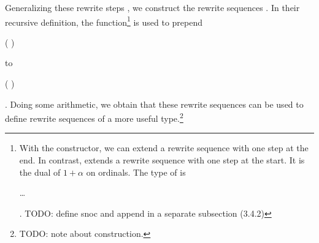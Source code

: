 Generalizing these rewrite steps
, we construct
the rewrite sequences
. In their
recursive definition, the 
function\footnote{With the
   constructor, we
  can extend a rewrite sequence with one step at the end. In contrast,
   extends a rewrite sequence
  with one step at the start. It is the dual of $1 + \alpha$ on
  ordinals. The type of 
  is \begin{coqdoccode}\ldots\end{coqdoccode}. TODO: define snoc and
    append in a separate subsection (3.4.2)} is used to
prepend \begin{coqdoccode}(
 
)\end{coqdoccode} to
\begin{coqdoccode}(
 
)\end{coqdoccode}. Doing some arithmetic, we obtain
that these rewrite sequences can be used to define rewrite sequences
 of a more
useful type.\footnote{TODO: note about 
  construction.}
